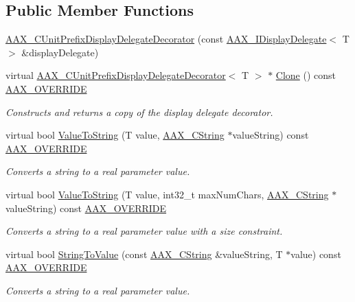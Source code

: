 \subsection*{Public Member Functions}
\begin{DoxyCompactItemize}
\item 
\hyperlink{a00046_a016d8c90bc04c7cb1ad6a1c23a4caed0}{A\+A\+X\+\_\+\+C\+Unit\+Prefix\+Display\+Delegate\+Decorator} (const \hyperlink{a00092}{A\+A\+X\+\_\+\+I\+Display\+Delegate}$<$ T $>$ \&display\+Delegate)
\item 
virtual \hyperlink{a00046}{A\+A\+X\+\_\+\+C\+Unit\+Prefix\+Display\+Delegate\+Decorator}$<$ T $>$ $\ast$ \hyperlink{a00046_aa09598c77cd1e9556013bc8cdd651a2b}{Clone} () const \hyperlink{a00149_ac2f24a5172689ae684344abdcce55463}{A\+A\+X\+\_\+\+O\+V\+E\+R\+R\+I\+D\+E}
\begin{DoxyCompactList}\small\item\em Constructs and returns a copy of the display delegate decorator. \end{DoxyCompactList}\item 
virtual bool \hyperlink{a00046_a74d63ddd342455674e9b1b00dc0f76e2}{Value\+To\+String} (T value, \hyperlink{a00042}{A\+A\+X\+\_\+\+C\+String} $\ast$value\+String) const \hyperlink{a00149_ac2f24a5172689ae684344abdcce55463}{A\+A\+X\+\_\+\+O\+V\+E\+R\+R\+I\+D\+E}
\begin{DoxyCompactList}\small\item\em Converts a string to a real parameter value. \end{DoxyCompactList}\item 
virtual bool \hyperlink{a00046_a0dc5128bed27ac1d671df4e4ac04d806}{Value\+To\+String} (T value, int32\+\_\+t max\+Num\+Chars, \hyperlink{a00042}{A\+A\+X\+\_\+\+C\+String} $\ast$value\+String) const \hyperlink{a00149_ac2f24a5172689ae684344abdcce55463}{A\+A\+X\+\_\+\+O\+V\+E\+R\+R\+I\+D\+E}
\begin{DoxyCompactList}\small\item\em Converts a string to a real parameter value with a size constraint. \end{DoxyCompactList}\item 
virtual bool \hyperlink{a00046_a6d930afe0a249f6936504c25d9c29764}{String\+To\+Value} (const \hyperlink{a00042}{A\+A\+X\+\_\+\+C\+String} \&value\+String, T $\ast$value) const \hyperlink{a00149_ac2f24a5172689ae684344abdcce55463}{A\+A\+X\+\_\+\+O\+V\+E\+R\+R\+I\+D\+E}
\begin{DoxyCompactList}\small\item\em Converts a string to a real parameter value. \end{DoxyCompactList}\end{DoxyCompactItemize}


